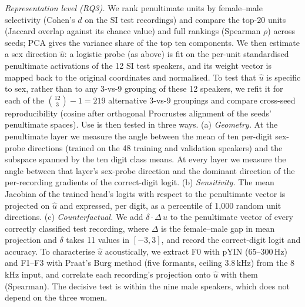 \documentclass[conference]{IEEEtran}
\begin{document}
\emph{Representation level (RQ3).} We rank penultimate units by female--male
selectivity (Cohen's $d$ on the SI test recordings) and compare the top-20
units (Jaccard overlap against its chance value) and full rankings (Spearman
$\rho$) across seeds; PCA gives the variance share of the top ten components.
We then estimate a sex direction $\hat{u}$: a logistic probe (as above) is fit
on the per-unit standardised penultimate activations of the 12 SI test
speakers, and its weight vector is mapped back to the original coordinates
and normalised. To test that $\hat{u}$ is specific to sex, rather than to any
3-vs-9 grouping of these 12 speakers, we refit it for each of the
$\binom{12}{3}-1=219$ alternative 3-vs-9 groupings and compare cross-seed
reproducibility (cosine after orthogonal Procrustes alignment of the seeds'
penultimate spaces). Use is then tested in three ways. (a) \emph{Geometry.}
At the penultimate layer we measure the angle between the mean of ten
per-digit sex-probe directions (trained on the 48 training and validation
speakers) and the subspace spanned by the ten digit class means. At every
layer we measure the angle between that layer's sex-probe direction and the
dominant direction of the per-recording gradients of the correct-digit logit.
(b) \emph{Sensitivity.} The mean Jacobian of the trained head's logits with
respect to the penultimate vector is projected on $\hat{u}$ and expressed, per
digit, as a percentile of 1{,}000 random unit directions. (c)
\emph{Counterfactual.} We add $\delta\cdot\Delta\,\hat{u}$ to the penultimate
vector of every correctly classified test recording, where $\Delta$ is the
female--male gap in mean projection and $\delta$ takes 11 values in
$[-3,3]$, and record the correct-digit logit and accuracy. To characterise
$\hat{u}$ acoustically, we extract F0 with pYIN (65--300\,Hz) and F1--F3 with
Praat's Burg method (five formants, ceiling 3.8\,kHz) from the 8\,kHz input,
and correlate each recording's projection onto $\hat{u}$ with them
(Spearman). The decisive test is within the nine male speakers, which does
not depend on the three women.
\end{document}
